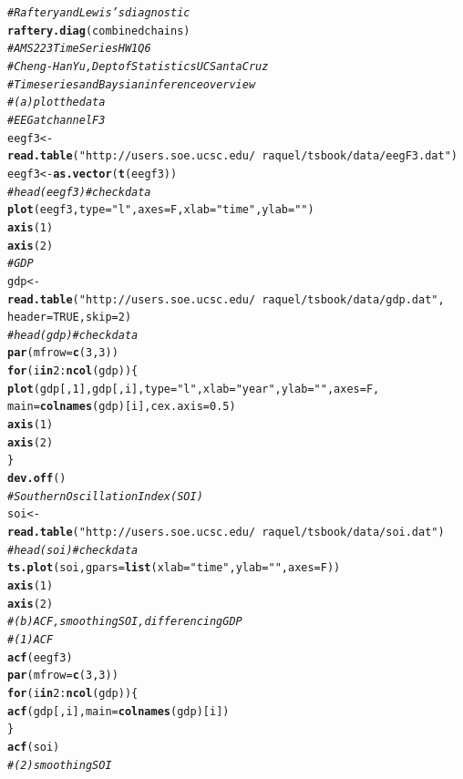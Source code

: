 \documentclass[12pt]{article}\usepackage[]{graphicx}\usepackage[]{color}
\makeatletter
\newcommand{\hlnum}[1]{\textcolor[rgb]{0.686,0.059,0.569}{#1}}%
\newcommand{\hlstr}[1]{\textcolor[rgb]{0.192,0.494,0.8}{#1}}%
\newcommand{\hlcom}[1]{\textcolor[rgb]{0.678,0.584,0.686}{\textit{#1}}}%
\newcommand{\hlopt}[1]{\textcolor[rgb]{0,0,0}{#1}}%
\newcommand{\hlstd}[1]{\textcolor[rgb]{0.345,0.345,0.345}{#1}}%
\newcommand{\hlkwa}[1]{\textcolor[rgb]{0.161,0.373,0.58}{\textbf{#1}}}%
\newcommand{\hlkwb}[1]{\textcolor[rgb]{0.69,0.353,0.396}{#1}}%
\newcommand{\hlkwc}[1]{\textcolor[rgb]{0.333,0.667,0.333}{#1}}%
\newcommand{\hlkwd}[1]{\textcolor[rgb]{0.737,0.353,0.396}{\textbf{#1}}}%
\newenvironment{kframe}{%
 \def\at@end@of@kframe{}%
 \ifinner\ifhmode%
  \def\at@end@of@kframe{\end{minipage}}%
  \begin{minipage}{\columnwidth}%
 \fi\fi%
 \def\FrameCommand##1{\hskip\@totalleftmargin \hskip-\fboxsep
 \colorbox{shadecolor}{##1}\hskip-\fboxsep
     \hskip-\linewidth \hskip-\@totalleftmargin \hskip\columnwidth}%
 \MakeFramed {\advance\hsize-\width
   \@totalleftmargin\z@ \linewidth\hsize
   \@setminipage}}%
 {\par\unskip\endMakeFramed%
 \at@end@of@kframe}
\newenvironment{knitrout}{}{} %
\makeatother
\begin{document}
\begin{knitrout}
\begin{kframe}
\begin{alltt}
\hlcom{# Raftery and Lewis’s diagnostic}
\hlkwd{raftery.diag}\hlstd{(combinedchains)}
\hlcom{# AMS 223 Time Series HW1 Q6}
\hlcom{# Cheng-Han Yu, Dept of Statistics UC Santa Cruz}
\hlcom{# Time series and Baysian inference overview}
\hlcom{# (a) plot the data}
\hlcom{# EEG at channel F3}
\hlstd{eegf3} \hlkwb{<-} \hlkwd{read.table}\hlstd{(}\hlstr{"http://users.soe.ucsc.edu/~raquel/tsbook/data/eegF3.dat"}\hlstd{)}
\hlstd{eegf3} \hlkwb{<-} \hlkwd{as.vector}\hlstd{(}\hlkwd{t}\hlstd{(eegf3))}
\hlcom{# head(eegf3)  # check data}
\hlkwd{plot}\hlstd{(eegf3,} \hlkwc{type} \hlstd{=} \hlstr{"l"}\hlstd{,} \hlkwc{axes} \hlstd{= F,} \hlkwc{xlab} \hlstd{=} \hlstr{"time"}\hlstd{,} \hlkwc{ylab} \hlstd{=} \hlstr{" "}\hlstd{)}
\hlkwd{axis}\hlstd{(}\hlnum{1}\hlstd{)}
\hlkwd{axis}\hlstd{(}\hlnum{2}\hlstd{)}
\hlcom{# GDP}
\hlstd{gdp} \hlkwb{<-} \hlkwd{read.table}\hlstd{(}\hlstr{"http://users.soe.ucsc.edu/~raquel/tsbook/data/gdp.dat"}\hlstd{,}
                  \hlkwc{header} \hlstd{=} \hlnum{TRUE}\hlstd{,} \hlkwc{skip} \hlstd{=} \hlnum{2}\hlstd{)}
\hlcom{# head(gdp)  # check data}
\hlkwd{par}\hlstd{(}\hlkwc{mfrow} \hlstd{=} \hlkwd{c}\hlstd{(}\hlnum{3}\hlstd{,} \hlnum{3}\hlstd{))}
\hlkwa{for} \hlstd{(i} \hlkwa{in} \hlnum{2}\hlopt{:} \hlkwd{ncol}\hlstd{(gdp)) \{}
  \hlkwd{plot}\hlstd{(gdp[,} \hlnum{1}\hlstd{], gdp[, i],} \hlkwc{type} \hlstd{=} \hlstr{"l"}\hlstd{,} \hlkwc{xlab} \hlstd{=} \hlstr{"year"}\hlstd{,} \hlkwc{ylab} \hlstd{=} \hlstr{" "}\hlstd{,} \hlkwc{axes} \hlstd{= F,}
       \hlkwc{main} \hlstd{=} \hlkwd{colnames}\hlstd{(gdp)[i],} \hlkwc{cex.axis} \hlstd{=} \hlnum{0.5}\hlstd{)}
  \hlkwd{axis}\hlstd{(}\hlnum{1}\hlstd{)}
  \hlkwd{axis}\hlstd{(}\hlnum{2}\hlstd{)}
\hlstd{\}}
\hlkwd{dev.off}\hlstd{()}
\hlcom{# Southern Oscillation Index (SOI)}
\hlstd{soi} \hlkwb{<-} \hlkwd{read.table}\hlstd{(}\hlstr{"http://users.soe.ucsc.edu/~raquel/tsbook/data/soi.dat"}\hlstd{)}
\hlcom{# head(soi)  # check data}
\hlkwd{ts.plot}\hlstd{(soi,} \hlkwc{gpars} \hlstd{=} \hlkwd{list}\hlstd{(}\hlkwc{xlab} \hlstd{=} \hlstr{"time"}\hlstd{,} \hlkwc{ylab} \hlstd{=} \hlstr{" "}\hlstd{,} \hlkwc{axes} \hlstd{= F))}
\hlkwd{axis}\hlstd{(}\hlnum{1}\hlstd{)}
\hlkwd{axis}\hlstd{(}\hlnum{2}\hlstd{)}
\hlcom{# (b) ACF, smoothing SOI, differencing GDP}
\hlcom{# (1) ACF}
\hlkwd{acf}\hlstd{(eegf3)}
\hlkwd{par}\hlstd{(}\hlkwc{mfrow} \hlstd{=} \hlkwd{c}\hlstd{(}\hlnum{3}\hlstd{,}\hlnum{3}\hlstd{))}
\hlkwa{for} \hlstd{(i} \hlkwa{in} \hlnum{2}\hlopt{:} \hlkwd{ncol}\hlstd{(gdp)) \{}
  \hlkwd{acf}\hlstd{(gdp[, i],} \hlkwc{main} \hlstd{=} \hlkwd{colnames}\hlstd{(gdp)[i])}
\hlstd{\}}
\hlkwd{acf}\hlstd{(soi)}
\hlcom{# (2) smoothing SOI}

\end{alltt}
\end{kframe}
\end{knitrout}
\end{document}
